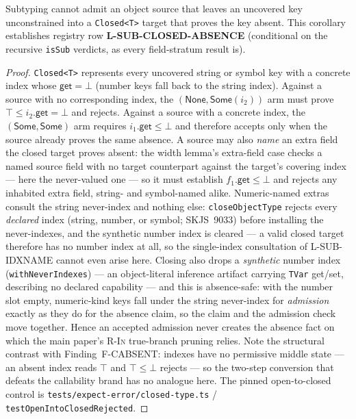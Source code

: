 \documentclass[11pt]{article}
\begin{document}
\begin{corollary}
\label{cor:open-closed}
Subtyping cannot admit an object source that leaves an uncovered key
unconstrained into a \texttt{Closed<T>} target that proves the key absent.
This corollary establishes registry row \textbf{L-SUB-CLOSED-ABSENCE}
(conditional on the recursive \texttt{isSub} verdicts, as every field-stratum
result is).
\end{corollary}
\begin{proof}
\texttt{Closed<T>} represents every uncovered string or symbol key with a
concrete index whose $\mathsf{get}=\bot$ (number keys fall back to the string
index). Against a source with no corresponding index, the
$(\mathsf{None},\mathsf{Some}(i_2))$ arm must prove
$\top \leq i_2.\mathsf{get}=\bot$ and rejects. Against a source with a
concrete index, the $(\mathsf{Some},\mathsf{Some})$ arm requires
$i_1.\mathsf{get}\leq\bot$ and therefore accepts only when the source already
proves the same absence. A source may also \emph{name} an extra field the
closed target proves absent: the width lemma's extra-field case checks a
named source field with no target counterpart against the target's covering
index — here the never-valued one — so it must establish
$f_1.\mathsf{get}\leq\bot$ and rejects any inhabited extra field, string- and
symbol-named alike. Numeric-named extras consult the string never-index and
nothing else: \texttt{closeObjectType} rejects every \emph{declared} index
(string, number, or symbol; SKJS~9033) before installing the never-indexes,
and the synthetic number index is cleared — a valid closed target therefore
has no number index at all, so the single-index consultation of
L-SUB-IDXNAME cannot even arise here.
Closing also drops a \emph{synthetic} number index
(\texttt{withNeverIndexes}) — an object-literal inference artifact carrying
\texttt{TVar} get/set, describing no declared capability — and this is
absence-safe: with the number slot empty, numeric-kind keys fall under the
string never-index for \emph{admission} exactly as they do for the absence
claim, so the claim and the admission check move together. Hence an accepted admission
never creates the absence fact on which the main paper's \textsc{R-In}
true-branch pruning relies. Note the structural contrast with
Finding~F-CABSENT: indexes have no permissive middle state — an absent index reads
$\top$ and $\top \leq \bot$ rejects — so the two-step conversion that
defeats the callability brand has no analogue here. The pinned
open-to-closed control is
\texttt{tests/expect-error/closed-type.ts} /
\texttt{testOpenIntoClosedRejected}.
\end{proof}
\end{document}
